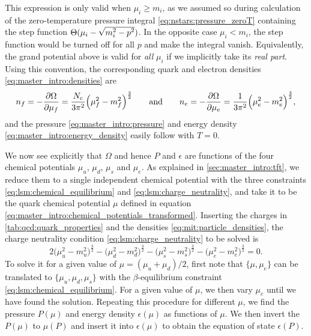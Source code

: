 This expression is only valid when $\mu_i \geq m_i$,
as we assumed so during calculation of the zero-temperature pressure integral \eqref{eq:nstars:pressure_zeroT} containing the step function $\Theta(\mu_i-\sqrt{\smash[b]{m_i^2-p^2}})$.
In the opposite case $\mu_i < m_i$, the step function would be turned off for all $p$ and make the integral vanish.
Equivalently, the grand potential above is valid for \emph{all} $\mu_i$ if we implicitly take its \emph{real part}.
Using this convention, the corresponding quark and electron densities \eqref{eq:master_intro:densities} are
\begin{equation}
	n_f = -\pdv{\Omega}{\mu_f} = \frac{N_c}{3 \pi^2} \Big( \mu_f^2 - m_f^2 \Big)^{\frac32}
	\qquad \text{and} \qquad
	n_e = -\pdv{\Omega}{\mu_e} = \frac{  1}{3 \pi^2} \Big( \mu_e^2 - m_e^2 \Big)^{\frac32},
\label{eq:mit:particle_densities}%
\end{equation}
and the pressure \eqref{eq:master_intro:pressure} and energy density \eqref{eq:master_intro:energy_density} easily follow with $T=0$.

We now see explicitly that $\Omega$ and hence $P$ and $\epsilon$ are functions of the four chemical potentials $\mu_u$, $\mu_d$, $\mu_s$ and $\mu_e$.
As explained in \cref{sec:master_intro:tft},
we reduce them to a single independent chemical potential with the three constraints \eqref{eq:lsm:chemical_equilibrium} and \eqref{eq:lsm:charge_neutrality},
and take it to be the quark chemical potential $\mu$ defined in equation \eqref{eq:master_intro:chemical_potentials_transformed}.
Inserting the charges in \cref{tab:qcd:quark_properties} and the densities \eqref{eq:mit:particle_densities},
the charge neutrality condition \eqref{eq:lsm:charge_neutrality} to be solved is
\begin{equation}
	2 \Big(\mu_u^2-m_u^2\Big)^\frac32
	- \Big(\mu_d^2-m_d^2\Big)^\frac32 
	- \Big(\mu_s^2-m_s^2\Big)^\frac32 
	- \Big(\mu_e^2-m_e^2\Big)^\frac32 = 0.
\label{eq:mit:charge_neutrality_explicit}
\end{equation}
To solve it for a given value of $\mu=(\mu_u+\mu_d)/2$,
first note that $\{\mu,\mu_e\}$
can be translated to $\{\mu_u,\mu_d,\mu_s\}$ with the $\beta$-equilibrium constraint \eqref{eq:lsm:chemical_equilibrium}.
For a given value of $\mu$, we then vary $\mu_e$ until we have found the solution.
Repeating this procedure for different $\mu$,
we find the pressure $P(\mu)$ and energy density $\epsilon(\mu)$ as functions of $\mu$.
We then invert the $P(\mu)$ to $\mu(P)$ and insert it into $\epsilon(\mu)$ to obtain the equation of state $\epsilon(P)$.

